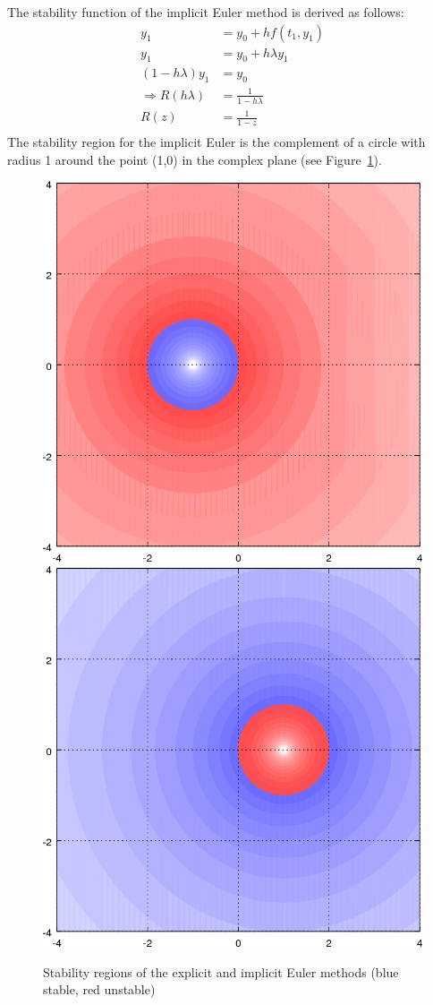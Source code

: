 \begin{example}
  The stability function of the implicit Euler method is derived as follows:
  \begin{equation}\begin{split}
  \label{eq:impl:stabil:impleuler}
    y_1 &= y_0 + h f(t_1, y_1) \\
    y_1 &= y_0 + h \lambda y_1 \\
    (1 - h \lambda) y_1 &= y_0 \\
    \Rightarrow R(h \lambda) &= \frac{1}{1- h \lambda} \\
    R(z) &= \frac{1}{1-z} \\
  \end{split}\end{equation}
The stability region for the implicit Euler is the complement of a
circle with radius 1 around the point (1,0) in the complex plane (see
Figure~\ref{fig:implicit:stability-euler}). %
\end{example}
\begin{figure}[tp]
  \centering
  \includegraphics[width=.47\textwidth]{fig/stability-euler}
  \hfill
  \includegraphics[width=.47\textwidth]{fig/stability-euler2}
  \caption{Stability regions of the explicit and implicit Euler
    methods (blue stable, red unstable)}
  \label{fig:implicit:stability-euler}
\end{figure}


